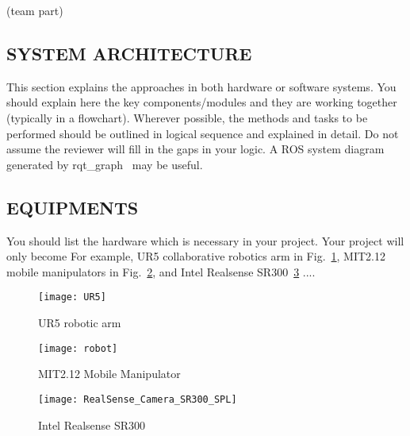 (team part)

\subsection{SYSTEM ARCHITECTURE}

This section explains the approaches in both hardware or software systems. You should explain here the key components/modules and they are working together (typically in a flowchart). Wherever possible, the methods and tasks to be performed should be outlined in logical sequence and explained in detail. Do not assume the reviewer will fill in the gaps in your logic. A ROS system diagram generated by rqt\_graph~\cite{rqt-graph} may be useful.

\subsection{EQUIPMENTS} 

You should list the hardware which is necessary in your project. Your project will only become For example, UR5 collaborative robotics arm in Fig.~\ref{figure:ur5}, MIT2.12 mobile manipulators in Fig.~\ref{figure:mit212mm}, and Intel Realsense SR300~\ref{figure:sr300} ....

\begin{figure}[!b]
\texttt{[image: UR5]}
\centering
\caption{UR5 robotic arm}
 \label{figure:ur5}
\end{figure}

\begin{figure}[h]
\texttt{[image: robot]}
\centering
\caption{MIT2.12 Mobile Manipulator}
 \label{figure:mit212mm}
\end{figure}

\begin{figure}[h]
\texttt{[image: RealSense\_Camera\_SR300\_SPL]}
\centering
\caption{Intel Realsense SR300}
 \label{figure:sr300}
\end{figure}

